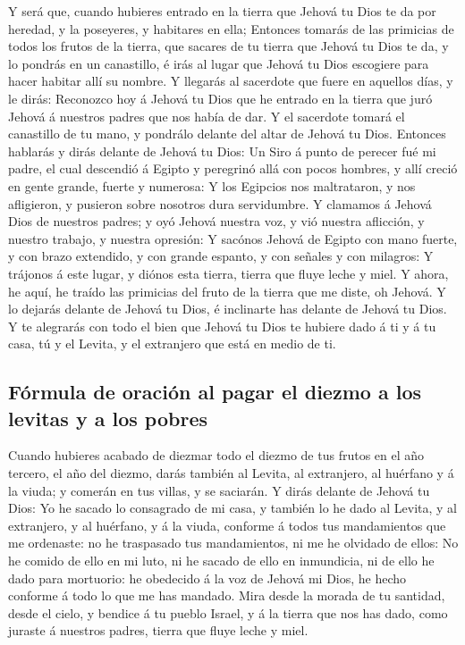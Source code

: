  Y será que, cuando hubieres entrado en la tierra que
Jehová tu Dios te da por heredad, y la poseyeres, y habitares en ella;
 Entonces tomarás de las primicias de todos los frutos de
la tierra, que sacares de tu tierra que Jehová tu Dios te da, y lo
pondrás en un canastillo, é irás al lugar que Jehová tu Dios escogiere
para hacer habitar allí su nombre.  Y llegarás al
sacerdote que fuere en aquellos días, y le dirás: Reconozco hoy á Jehová
tu Dios que he entrado en la tierra que juró Jehová á nuestros padres
que nos había de dar.  Y el sacerdote tomará el canastillo
de tu mano, y pondrálo delante del altar de Jehová tu Dios.
 Entonces hablarás y dirás delante de Jehová tu Dios: Un
Siro á punto de perecer fué mi padre, el cual descendió á Egipto y
peregrinó allá con pocos hombres, y allí creció en gente grande, fuerte
y numerosa:  Y los Egipcios nos maltrataron, y nos
afligieron, y pusieron sobre nosotros dura servidumbre.  Y
clamamos á Jehová Dios de nuestros padres; y oyó Jehová nuestra voz, y
vió nuestra aflicción, y nuestro trabajo, y nuestra opresión:
 Y sacónos Jehová de Egipto con mano fuerte, y con brazo
extendido, y con grande espanto, y con señales y con milagros:
 Y trájonos á este lugar, y diónos esta tierra, tierra que
fluye leche y miel.  Y ahora, he aquí, he traído las
primicias del fruto de la tierra que me diste, oh Jehová. Y lo dejarás
delante de Jehová tu Dios, é inclinarte has delante de Jehová tu Dios.
 Y te alegrarás con todo el bien que Jehová tu Dios te
hubiere dado á ti y á tu casa, tú y el Levita, y el extranjero que está
en medio de ti.

\hypertarget{fuxf3rmula-de-oraciuxf3n-al-pagar-el-diezmo-a-los-levitas-y-a-los-pobres}{%
\subsection{Fórmula de oración al pagar el diezmo a los levitas y a los
pobres}\label{fuxf3rmula-de-oraciuxf3n-al-pagar-el-diezmo-a-los-levitas-y-a-los-pobres}}

 Cuando hubieres acabado de diezmar todo el diezmo de tus
frutos en el año tercero, el año del diezmo, darás también al Levita, al
extranjero, al huérfano y á la viuda; y comerán en tus villas, y se
saciarán.  Y dirás delante de Jehová tu Dios: Yo he
sacado lo consagrado de mi casa, y también lo he dado al Levita, y al
extranjero, y al huérfano, y á la viuda, conforme á todos tus
mandamientos que me ordenaste: no he traspasado tus mandamientos, ni me
he olvidado de ellos:  No he comido de ello en mi luto,
ni he sacado de ello en inmundicia, ni de ello he dado para mortuorio:
he obedecido á la voz de Jehová mi Dios, he hecho conforme á todo lo que
me has mandado.  Mira desde la morada de tu santidad,
desde el cielo, y bendice á tu pueblo Israel, y á la tierra que nos has
dado, como juraste á nuestros padres, tierra que fluye leche y miel.

